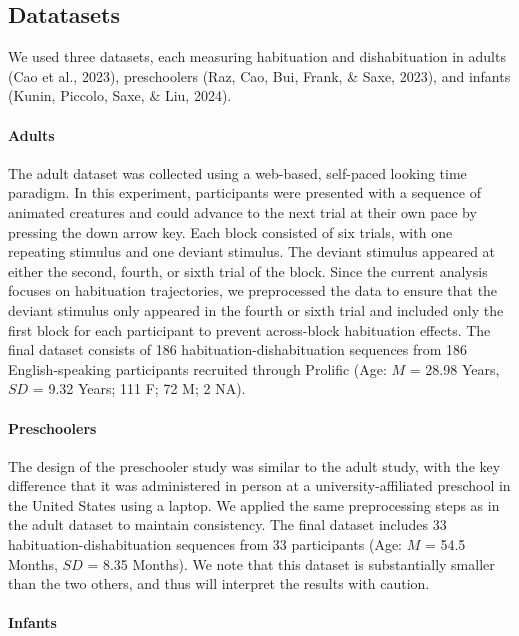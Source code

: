\documentclass[10pt, letterpaper]{article}
\begin{document}
\hypertarget{datatasets}{%
\subsection{Datatasets}\label{datatasets}}

We used three datasets, each measuring habituation and dishabituation in
adults (Cao et al., 2023), preschoolers (Raz, Cao, Bui, Frank, \& Saxe,
2023), and infants (Kunin, Piccolo, Saxe, \& Liu, 2024).

\hypertarget{adults}{%
\paragraph{Adults}\label{adults}}

The adult dataset was collected using a web-based, self-paced looking
time paradigm. In this experiment, participants were presented with a
sequence of animated creatures and could advance to the next trial at
their own pace by pressing the down arrow key. Each block consisted of
six trials, with one repeating stimulus and one deviant stimulus. The
deviant stimulus appeared at either the second, fourth, or sixth trial
of the block. Since the current analysis focuses on habituation
trajectories, we preprocessed the data to ensure that the deviant
stimulus only appeared in the fourth or sixth trial and included only
the first block for each participant to prevent across-block habituation
effects. The final dataset consists of 186 habituation-dishabituation
sequences from 186 English-speaking participants recruited through
Prolific (Age: \(M\) = 28.98 Years, \(SD\) = 9.32 Years; 111 F; 72 M; 2
NA).

\hypertarget{preschoolers}{%
\paragraph{Preschoolers}\label{preschoolers}}

The design of the preschooler study was similar to the adult study, with
the key difference that it was administered in person at a
university-affiliated preschool in the United States using a laptop. We
applied the same preprocessing steps as in the adult dataset to maintain
consistency. The final dataset includes 33 habituation-dishabituation
sequences from 33 participants (Age: \(M\) = 54.5 Months, \(SD\) = 8.35
Months). We note that this dataset is substantially smaller than the two
others, and thus will interpret the results with caution.

\hypertarget{infants}{%
\paragraph{Infants}\label{infants}}
\end{document}
